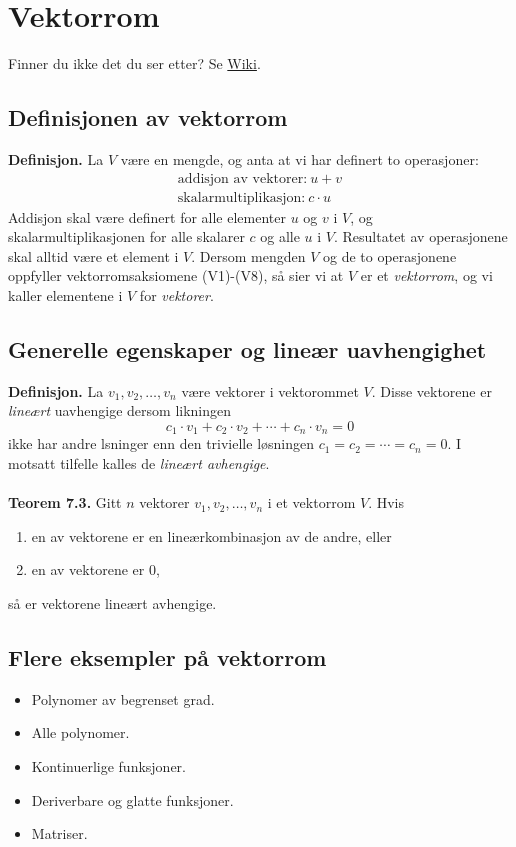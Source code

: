 \documentclass{article}
\begin{document}
\clearpage



\section{Vektorrom}
Finner du ikke det du ser etter? Se \href{https://www.math.ntnu.no/emner/TMA4110/2020h/notater/7-vektorrom.pdf}{Wiki}.


\subsection{Definisjonen av vektorrom}
\textbf{Definisjon.} La $V$ være en mengde, og anta at vi har definert to operasjoner:
\begin{gather*}
    \text{addisjon av vektorer:} \ u + v \\
    \text{skalarmultiplikasjon:} \ c \cdot u
\end{gather*}
Addisjon skal være definert for alle elementer $u$ og $v$ i $V$, og skalarmultiplikasjonen for alle skalarer $c$ og alle $u$ i $V$. Resultatet av operasjonene skal alltid være et element i $V$. Dersom mengden $V$ og de to operasjonene oppfyller vektorromsaksiomene (V1)-(V8), så sier vi at $V$ er et \textit{vektorrom}, og vi kaller elementene i $V$ for \textit{vektorer}.


\subsection{Generelle egenskaper og lineær uavhengighet}
\textbf{Definisjon.} La $v_1, v_2, \dots, v_n$ være vektorer i vektorommet $V$. Disse vektorene er \textit{lineært} uavhengige dersom likningen
\[c_1 \cdot v_1 + c_2 \cdot v_2 + \cdots + c_n \cdot v_n = 0 \]
ikke har andre lsninger enn den trivielle løsningen $c_1 = c_2 = \cdots = c_n = 0.$ I motsatt tilfelle kalles de \textit{lineært avhengige}.
\\\\
\textbf{Teorem 7.3.} Gitt $n$ vektorer $v_1, v_2, \dots, v_n$ i et vektorrom $V$. Hvis
\begin{enumerate}
    \item en av vektorene er en lineærkombinasjon av de andre, eller
    \item en av vektorene er $0$,
\end{enumerate}
så er vektorene lineært avhengige.


\subsection{Flere eksempler på vektorrom}
\begin{itemize}
    \item Polynomer av begrenset grad.
    \item Alle polynomer.
    \item Kontinuerlige funksjoner.
    \item Deriverbare og glatte funksjoner.
    \item Matriser.
\end{itemize}
\end{document}
